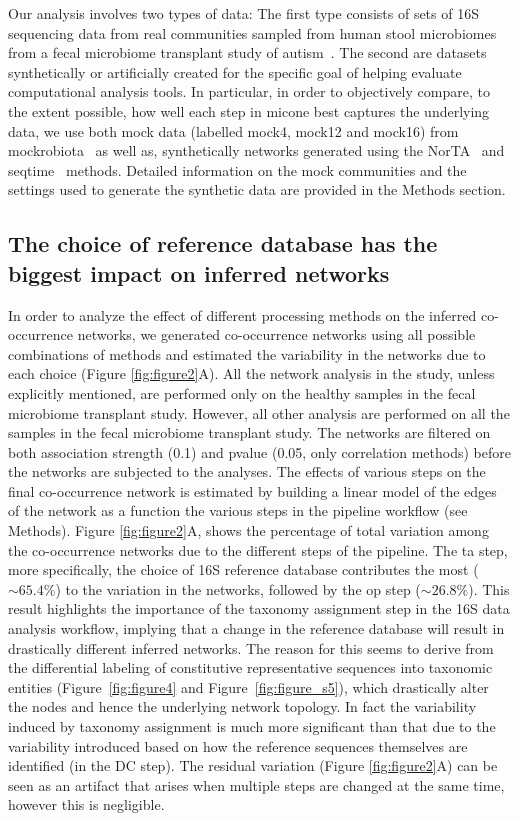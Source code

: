   Our analysis involves two types of data: The first type consists of sets of 16S sequencing data from real communities sampled from human stool microbiomes from a fecal microbiome transplant study of autism~\cite{Kang2017}.
  The second are datasets synthetically or artificially created for the specific goal of helping evaluate computational analysis tools.
  In particular, in order to objectively compare, to the extent possible, how well each step in \ac{micone} best captures the underlying data, we use both mock data (labelled mock4, mock12 and mock16) from mockrobiota~\cite{Bokulich2016} as well as, synthetically networks generated using the NorTA~\cite{Kurtz2015} and seqtime~\cite{Rottjers2018} methods.
  Detailed information on the mock communities and the settings used to generate the synthetic data are provided in the Methods section.

  \FloatBarrier

  \subsection*{The choice of reference database has the biggest impact on inferred networks}

  In order to analyze the effect of different processing methods on the inferred co-occurrence networks, we generated co-occurrence networks using all possible combinations of methods and estimated the variability in the networks due to each choice (Figure \ref{fig:figure2}A).
  All the network analysis in the study, unless explicitly mentioned, are performed only on the healthy samples in the fecal microbiome transplant study.
  However, all other analysis are performed on all the samples in the fecal microbiome transplant study.
  The networks are filtered on both association strength (0.1) and pvalue (0.05, only correlation methods) before the networks are subjected to the analyses.
  The effects of various steps on the final co-occurrence network is estimated by building a linear model of the edges of the network as a function the various steps in the pipeline workflow (see Methods).
  Figure \ref{fig:figure2}A, shows the percentage of total variation among the co-occurrence networks due to the different steps of the pipeline.
  The \ac{ta} step, more specifically, the choice of 16S reference database contributes the most ($\sim65.4\%$) to the variation in the networks, followed by the \ac{op} step ($\sim26.8\%$).
  This result highlights the importance of the taxonomy assignment step in the 16S data analysis workflow, implying that a change in the reference database will result in drastically different inferred networks.
  The reason for this seems to derive from the differential labeling of constitutive representative sequences into taxonomic entities (Figure~\ref{fig:figure4} and Figure~\ref{fig:figure_s5}), which drastically alter the nodes and hence the underlying network topology.
  In fact the variability induced by taxonomy assignment is much more significant than that due to the variability introduced based on how the reference sequences themselves are identified (in the DC step).
  The residual variation (Figure \ref{fig:figure2}A) can be seen as an artifact that arises when multiple steps are changed at the same time, however this is negligible.

